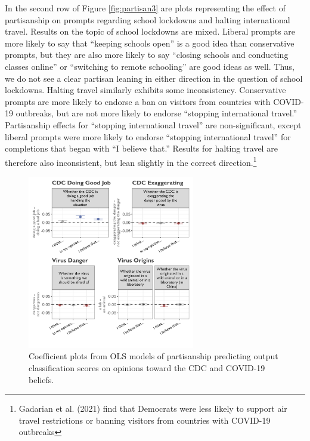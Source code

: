 \documentclass{article}
\begin{document}
In the second row of Figure \ref{fig:partisan3} are plots representing the effect of
partisanship on prompts regarding school lockdowns and halting
international travel. Results on the topic of school lockdowns are
mixed. Liberal prompts are more likely to say that ``keeping schools
open'' is a good idea than conservative prompts, but they are also more
likely to say ``closing schools and conducting classes online'' or
``switching to remote schooling'' are good ideas as well. Thus, we do
not see a clear partisan leaning in either direction in the question of
school lockdowns. Halting travel similarly exhibits some inconsistency.
Conservative prompts are more likely to endorse a ban on visitors from
countries with COVID-19 outbreaks, but are not more likely to endorse
``stopping international travel.'' Partisanship effects for ``stopping
international travel'' are non-significant, except liberal prompts were
more likely to endorse ``stopping international travel'' for completions
that began with ``I believe that.'' Results for halting travel are
therefore also inconsistent, but lean slightly in the correct
direction.\footnote{Gadarian et al. (2021) find that Democrats were less
  likely to support air travel restrictions or banning visitors from
  countries with COVID-19 outbreaks}

\begin{figure}[!htbp]
  \captionsetup{justification=raggedright,singlelinecheck=false}
  \caption{Coefficient plots from OLS models of partisanship predicting output classification scores on opinions toward the CDC and COVID-19 beliefs.}
  \label{fig:partisan4}
  \centering
  \includegraphics[width=0.65\textwidth]{./figures/media/image8.png}
\end{figure}
\end{document}
